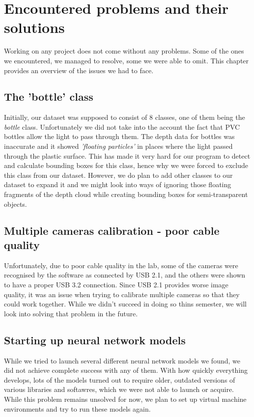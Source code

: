 \chapter{Encountered problems and their solutions}
Working on any project does not come without any problems. Some of the ones we encountered, we managed to resolve, some we were able to omit. This chapter provides an overview of the issues we had to face.

\section{The 'bottle' class}
Initially, our dataset was supposed to consist of 8 classes, one of them being the \textit{bottle} class. Unfortunately we did not take into the account the fact that PVC bottles allow the light to pass through them. The depth data for bottles was inaccurate and it showed \textit{'floating particles'} in places where the light passed through the plastic surface. This has made it very hard for our program to detect and calculate bounding boxes for this class, hence why we were forced to exclude this class from our dataset. However, we do plan to add other classes to our dataset to expand it and we might look into ways of ignoring those floating fragments of the depth cloud while creating bounding boxes for semi-transparent objects.

\section{Multiple cameras calibration - poor cable quality}
Unfortunately, due to poor cable quality in the lab, some of the cameras were recognised by the software as connected by USB 2.1, and the others were shown to have a proper USB 3.2 connection. Since USB 2.1 provides worse image quality, it was an issue when trying to calibrate multiple cameras so that they could work together. While we didn't succeed in doing so thins semester, we will look into solving that problem in the future.

\section{Starting up neural network models}
While we tried to launch several different neural network models we found, we did not achieve complete success with any of them. With how quickly everything develops, lots of the models turned out to require older, outdated versions of various libraries and softawres, which we were not able to launch or acquire. While this problem remains unsolved for now, we plan to set up virtual machine environments and try to run these models again.

